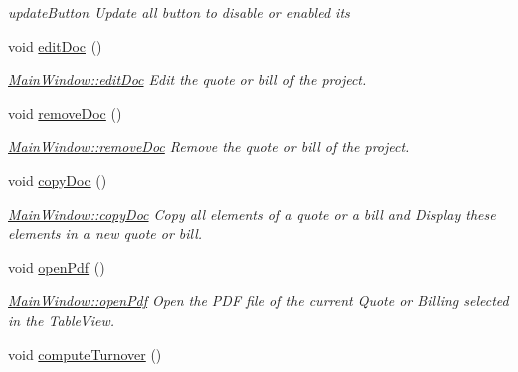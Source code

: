 \begin{DoxyCompactItemize}
\begin{DoxyCompactList}\small\item\em update\+Button Update all button to disable or enabled its \end{DoxyCompactList}\item 
\hypertarget{classGui_1_1MainWindow_a06bc679c41574cb679c6e5e7b673139c}{}void \hyperlink{classGui_1_1MainWindow_a06bc679c41574cb679c6e5e7b673139c}{edit\+Doc} ()\label{classGui_1_1MainWindow_a06bc679c41574cb679c6e5e7b673139c}

\begin{DoxyCompactList}\small\item\em \hyperlink{classGui_1_1MainWindow_a06bc679c41574cb679c6e5e7b673139c}{Main\+Window\+::edit\+Doc} Edit the quote or bill of the project. \end{DoxyCompactList}\item 
\hypertarget{classGui_1_1MainWindow_af86458ad953cb70fb7a88245a6047550}{}void \hyperlink{classGui_1_1MainWindow_af86458ad953cb70fb7a88245a6047550}{remove\+Doc} ()\label{classGui_1_1MainWindow_af86458ad953cb70fb7a88245a6047550}

\begin{DoxyCompactList}\small\item\em \hyperlink{classGui_1_1MainWindow_af86458ad953cb70fb7a88245a6047550}{Main\+Window\+::remove\+Doc} Remove the quote or bill of the project. \end{DoxyCompactList}\item 
\hypertarget{classGui_1_1MainWindow_adf1e721c73626d1810dd90c84920dcde}{}void \hyperlink{classGui_1_1MainWindow_adf1e721c73626d1810dd90c84920dcde}{copy\+Doc} ()\label{classGui_1_1MainWindow_adf1e721c73626d1810dd90c84920dcde}

\begin{DoxyCompactList}\small\item\em \hyperlink{classGui_1_1MainWindow_adf1e721c73626d1810dd90c84920dcde}{Main\+Window\+::copy\+Doc} Copy all elements of a quote or a bill and Display these elements in a new quote or bill. \end{DoxyCompactList}\item 
\hypertarget{classGui_1_1MainWindow_a6fc6c0f088d3996ad941705a13d7aaae}{}void \hyperlink{classGui_1_1MainWindow_a6fc6c0f088d3996ad941705a13d7aaae}{open\+Pdf} ()\label{classGui_1_1MainWindow_a6fc6c0f088d3996ad941705a13d7aaae}

\begin{DoxyCompactList}\small\item\em \hyperlink{classGui_1_1MainWindow_a6fc6c0f088d3996ad941705a13d7aaae}{Main\+Window\+::open\+Pdf} Open the P\+D\+F file of the current Quote or Billing selected in the Table\+View. \end{DoxyCompactList}\item 
\hypertarget{classGui_1_1MainWindow_aa4cfc2b980835fe1ccd5b869a237c05f}{}void \hyperlink{classGui_1_1MainWindow_aa4cfc2b980835fe1ccd5b869a237c05f}{compute\+Turnover} ()\label{classGui_1_1MainWindow_aa4cfc2b980835fe1ccd5b869a237c05f}


\end{DoxyCompactItemize}
